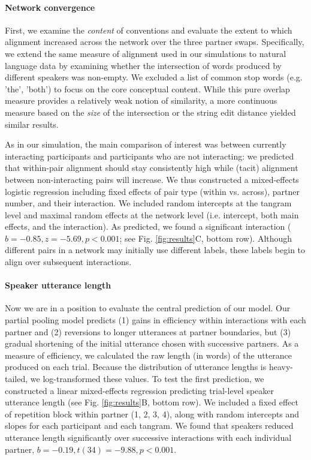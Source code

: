 \paragraph{Network convergence}

First, we examine the \emph{content} of conventions and evaluate the extent to which alignment increased across the network over the three partner swaps. 
Specifically, we extend the same measure of alignment used in our simulations to natural language data by examining whether the intersection of words produced by different speakers was non-empty.
We excluded a list of common stop words (e.g. 'the', 'both') to focus on the core conceptual content.
While this pure overlap measure provides a relatively weak notion of similarity, a more continuous measure based on the \emph{size} of the intersection or the string edit distance yielded similar results.

As in our simulation, the main comparison of interest was between currently interacting participants and participants who are not interacting: we predicted that within-pair alignment should stay consistently high while (tacit) alignment between non-interacting pairs will increase. 
We thus constructed a mixed-effects logistic regression including fixed effects of pair type (within vs. across), partner number, and their interaction.
We included random intercepts at the tangram level and maximal random effects at the network level (i.e. intercept, both main effects, and the interaction).
As predicted, we found a significant interaction ($b = -0.85, z = -5.69, p < 0.001$; see Fig. \ref{fig:results}C, bottom row).
Although different pairs in a network may initially use different labels, these labels begin to align over subsequent interactions. 

\paragraph{Speaker utterance length}

Now we are in a position to evaluate the central prediction of our model.
Our partial pooling model predicts (1) gains in efficiency within interactions with each partner and (2) reversions to longer utterances at partner boundaries, but (3) gradual shortening of  the initial utterance chosen with successive partners.
As a measure of efficiency, we calculated the raw length (in words) of the utterance produced on each trial.
Because the distribution of utterance lengths is heavy-tailed, we log-transformed these values.
To test the first prediction, we constructed a linear mixed-effects regression predicting trial-level speaker utterance length (see Fig. \ref{fig:results}B, bottom row).
We included a fixed effect of repetition block within partner (1, 2, 3, 4), along with random intercepts and slopes for each participant and each tangram. 
We found that speakers reduced utterance length significantly over successive interactions with each individual partner, $b = -0.19, t(34) = -9.88, p < 0.001$.

